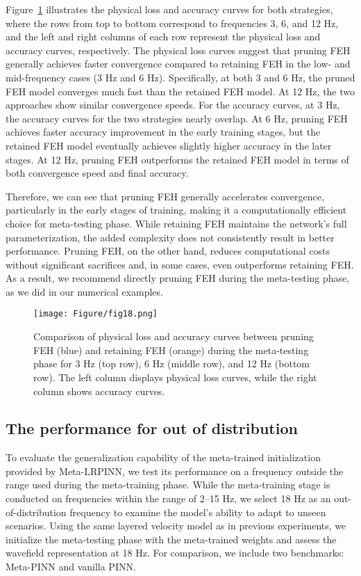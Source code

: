 Figure~\ref{fig18} illustrates the physical loss and accuracy curves for both strategies, where the rows from top to bottom correspond to frequencies 3, 6, and 12 Hz, and the left and right columns of each row represent the physical loss and accuracy curves, respectively. The physical loss curves suggest that pruning FEH generally achieves faster convergence compared to retaining FEH in the low- and mid-frequency cases (3 Hz and 6 Hz). Specifically, at both 3 and 6 Hz, the pruned FEH model converges much fast than the retained FEH model. At 12 Hz, the two approaches show similar convergence speeds. For the accuracy curves, at 3 Hz, the accuracy curves for the two strategies nearly overlap. At 6 Hz, pruning FEH achieves faster accuracy improvement in the early training stages, but the retained FEH model eventually achieves slightly higher accuracy in the later stages. At 12 Hz, pruning FEH outperforms the retained FEH model in terms of both convergence speed and final accuracy. 

Therefore, we can see that pruning FEH generally accelerates convergence, particularly in the early stages of training, making it a computationally efficient choice for meta-testing phase. While retaining FEH maintains the network’s full parameterization, the added complexity does not consistently result in better performance. Pruning FEH, on the other hand, reduces computational costs without significant sacrifices and, in some cases, even outperforms retaining FEH. As a result, we recommend directly pruning FEH during the meta-testing phase, as we did in our numerical examples.


\begin{figure}[htbp]
\centering
\texttt{[image: Figure/fig18.png]}
\caption{Comparison of physical loss and accuracy curves between pruning FEH (blue) and retaining FEH (orange) during the meta-testing phase for 3 Hz (top row), 6 Hz (middle row), and 12 Hz (bottom row). The left column displays physical loss curves, while the right column shows accuracy curves.}
\label{fig18}
\end{figure}


\subsection{The performance for out of distribution}
To evaluate the generalization capability of the meta-trained initialization provided by Meta-LRPINN, we test its performance on a frequency outside the range used during the meta-training phase. While the meta-training stage is conducted on frequencies within the range of 2–15 Hz, we select 18 Hz as an out-of-distribution frequency to examine the model's ability to adapt to unseen scenarios. Using the same layered velocity model as in previous experiments, we initialize the meta-testing phase with the meta-trained weights and assess the wavefield representation at 18 Hz. For comparison, we include two benchmarks: Meta-PINN and vanilla PINN. 

